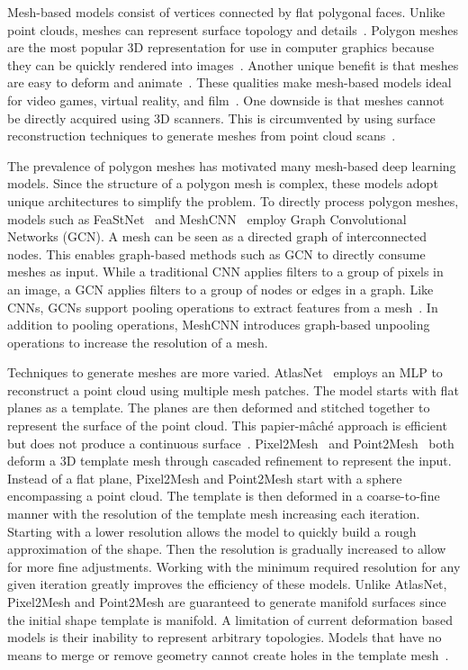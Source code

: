 Mesh-based models consist of vertices connected by flat polygonal faces. Unlike point clouds, meshes can represent surface topology and details~\cite{Xiao2020}. Polygon meshes are the most popular 3D representation for use in computer graphics because they can be quickly rendered into images~\cite{Watt1996}. Another unique benefit is that meshes are easy to deform and animate~\cite{Wang2018}. These qualities make mesh-based models ideal for video games, virtual reality, and film~\cite{Nash2020}. One downside is that meshes cannot be directly acquired using 3D scanners. This is circumvented by using surface reconstruction techniques to generate meshes from point cloud scans~\cite{Yuan2022}.

The prevalence of polygon meshes has motivated many mesh-based deep learning models. Since the structure of a polygon mesh is complex, these models adopt unique architectures to simplify the problem. To directly process polygon meshes, models such as FeaStNet~\cite{Verma2018} and MeshCNN~\cite{Hanocka2019} employ Graph Convolutional Networks (GCN). A mesh can be seen as a directed graph of interconnected nodes. This enables graph-based methods such as GCN to directly consume meshes as input. While a traditional CNN applies filters to a group of pixels in an image, a GCN applies filters to a group of nodes or edges in a graph. Like CNNs, GCNs support pooling operations to extract features from a mesh~\cite{Verma2018}. In addition to pooling operations, MeshCNN introduces graph-based unpooling operations to increase the resolution of a mesh.

Techniques to generate meshes are more varied. AtlasNet~\cite{Groueix2018} employs an MLP to reconstruct a point cloud using multiple mesh patches. The model starts with flat planes as a template. The planes are then deformed and stitched together to represent the surface of the point cloud. This papier-m{\^a}ch{\'e} approach is efficient but does not produce a continuous surface~\cite{Groueix2018}. Pixel2Mesh~\cite{Wang2018} and Point2Mesh~\cite{Hanocka2020} both deform a 3D template mesh through cascaded refinement to represent the input. Instead of a flat plane, Pixel2Mesh and Point2Mesh start with a sphere encompassing a point cloud. The template is then deformed in a coarse-to-fine manner with the resolution of the template mesh increasing each iteration. Starting with a lower resolution allows the model to quickly build a rough approximation of the shape. Then the resolution is gradually increased to allow for more fine adjustments. Working with the minimum required resolution for any given iteration greatly improves the efficiency of these models. Unlike AtlasNet, Pixel2Mesh and Point2Mesh are guaranteed to generate manifold surfaces since the initial shape template is manifold. A limitation of current deformation based models is their inability to represent arbitrary topologies. Models that have no means to merge or remove geometry cannot create holes in the template mesh~\cite{Wang2018, Hanocka2020}.

